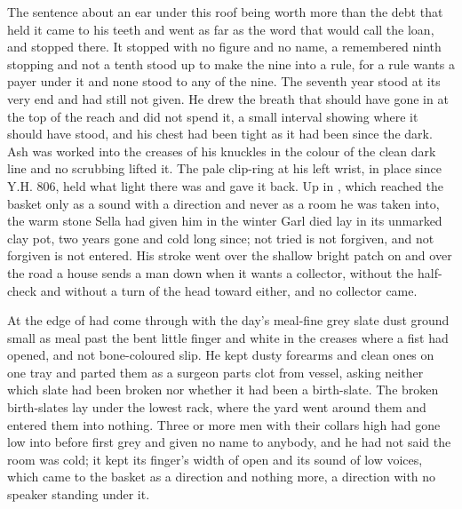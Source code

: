 The sentence about an ear under this roof being worth more than the debt that held it came to his teeth and went as far as the word that would call the loan, and stopped there. It stopped with no figure and no name, a remembered ninth stopping and not a tenth stood up to make the nine into a rule, for a rule wants a payer under it and none stood to any of the nine. The seventh year stood at its very end and had still not given. He drew the breath that should have gone in at the top of the reach and did not spend it, a small interval showing where it should have stood, and his chest had been tight as it had been since the dark. Ash was worked into the creases of his knuckles in the colour of the clean dark line and no scrubbing lifted it. The pale clip-ring at his left wrist, in place since Y.H. 806, held what light there was and gave it back. Up in , which reached the basket only as a sound with a direction and never as a room he was taken into, the warm stone Sella had given him in the winter Garl died lay in its unmarked clay pot, two years gone and cold long since; not tried is not forgiven, and not forgiven is not entered. His stroke went over the shallow bright patch on  and over the road a house sends a man down when it wants a collector, without the half-check and without a turn of the head toward either, and no collector came.

At the edge of   had come through with the day's meal-fine grey slate dust ground small as meal past the bent little finger and white in the creases where a fist had opened, and not bone-coloured slip. He kept dusty forearms and clean ones on one tray and parted them as a surgeon parts clot from vessel, asking neither which slate had been broken nor whether it had been a birth-slate. The broken birth-slates lay under the lowest rack, where the yard went around them and entered them into nothing. Three or more men with their collars high had gone low into  before first grey and given no name to anybody, and he had not said the room was cold; it kept its finger's width of open and its sound of low voices, which came to the basket as a direction and nothing more, a direction with no speaker standing under it.

